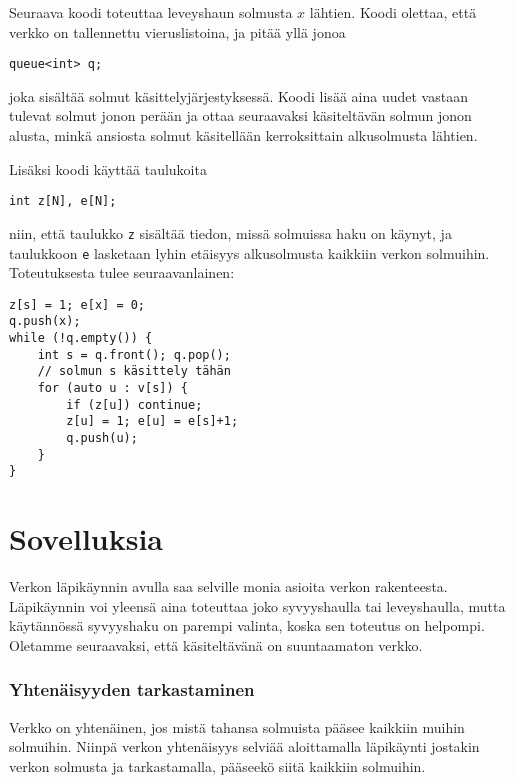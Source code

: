 Seuraava koodi toteuttaa leveyshaun
solmusta $x$ lähtien.
Koodi olettaa, että verkko on tallennettu
vieruslistoina, ja pitää yllä jonoa
\begin{lstlisting}
queue<int> q;
\end{lstlisting}
joka sisältää solmut käsittelyjärjestyksessä.
Koodi lisää aina uudet vastaan tulevat solmut
jonon perään ja ottaa seuraavaksi käsiteltävän
solmun jonon alusta,
minkä ansiosta solmut käsitellään
kerroksittain alkusolmusta lähtien.

Lisäksi koodi käyttää taulukoita
\begin{lstlisting}
int z[N], e[N];
\end{lstlisting}
niin, että taulukko \texttt{z} sisältää tiedon,
missä solmuissa haku on käynyt,
ja taulukkoon \texttt{e} lasketaan lyhin
etäisyys alkusolmusta kaikkiin verkon solmuihin.
Toteutuksesta tulee seuraavanlainen:
\begin{lstlisting}
z[s] = 1; e[x] = 0;
q.push(x);
while (!q.empty()) {
    int s = q.front(); q.pop();
    // solmun s käsittely tähän     
    for (auto u : v[s]) {
        if (z[u]) continue;
        z[u] = 1; e[u] = e[s]+1;
        q.push(u);
    }
}
\end{lstlisting}

\section{Sovelluksia}

Verkon läpikäynnin avulla
saa selville monia asioita
verkon rakenteesta.
Läpikäynnin voi yleensä aina toteuttaa
joko syvyyshaulla tai leveyshaulla,
mutta käytännössä syvyyshaku on parempi valinta,
koska sen toteutus on helpompi.
Oletamme seuraavaksi, että käsiteltävänä on
suuntaamaton verkko.

\subsubsection{Yhtenäisyyden tarkastaminen}


Verkko on yhtenäinen,
jos mistä tahansa solmuista
pääsee kaikkiin muihin solmuihin.
Niinpä verkon yhtenäisyys selviää
aloittamalla läpikäynti
jostakin verkon solmusta ja
tarkastamalla, pääseekö siitä kaikkiin solmuihin.

